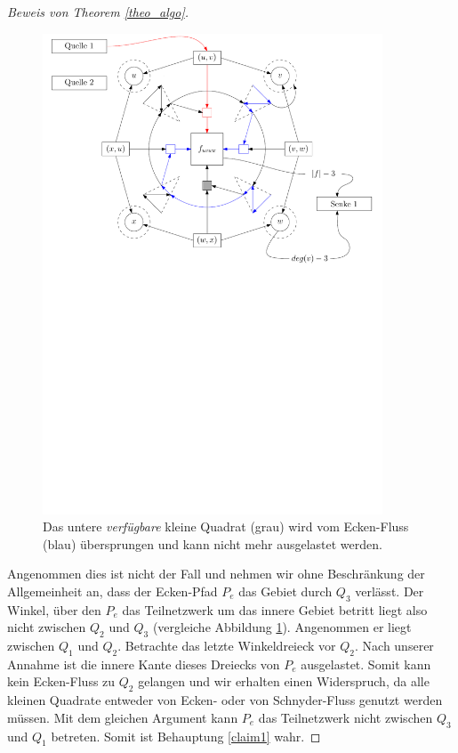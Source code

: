 \begin{proof}[Beweis von Theorem \ref{theo_algo}]
\begin{figure}
	\centering
  	\includegraphics[width=0.9\textwidth]{combined_face_skip.pdf}
  	\caption{Das untere \textit{verfügbare} kleine Quadrat (grau) wird vom Ecken-Fluss (blau) übersprungen und kann nicht mehr ausgelastet werden.}
	\label{combined_face_skip}
\end{figure}

Angenommen dies ist nicht der Fall und nehmen wir ohne Beschränkung der Allgemeinheit an, dass der Ecken-Pfad $P_e$ das Gebiet durch $Q_3$ verlässt. Der Winkel, über den $P_e$ das Teilnetzwerk um das innere Gebiet betritt liegt also nicht zwischen $Q_2$ und $Q_3$ (vergleiche Abbildung \ref{combined_face_skip}). Angenommen er liegt zwischen $Q_1$ und $Q_2$. Betrachte das letzte Winkeldreieck vor $Q_2$. Nach unserer Annahme ist die innere Kante dieses Dreiecks von $P_e$ ausgelastet. Somit kann kein Ecken-Fluss zu $Q_2$ gelangen und wir erhalten einen Widerspruch, da alle kleinen Quadrate entweder von Ecken- oder von Schnyder-Fluss genutzt werden müssen. Mit dem gleichen Argument kann $P_e$ das Teilnetzwerk nicht zwischen $Q_3$ und $Q_1$ betreten. Somit ist Behauptung \ref{claim1} wahr.


\end{proof}
